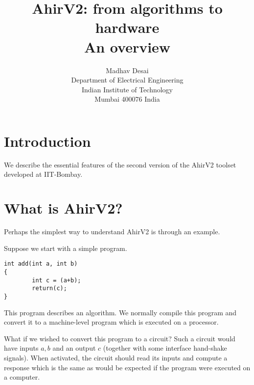 \documentclass{article}
\title{AhirV2: from algorithms to hardware \\ An overview }
\author{Madhav Desai \\ Department of Electrical Engineering \\ Indian Institute of Technology \\
	Mumbai 400076 India}
\begin{document}
\maketitle

\section{Introduction}

We describe the essential features
of the second version of the AhirV2 toolset
developed at IIT-Bombay.

\section{What is AhirV2?}

Perhaps the simplest way to understand AhirV2 is
through an example.

Suppose we start with a simple program.
\begin{verbatim}
int add(int a, int b)
{
        int c = (a+b);
        return(c);
}
\end{verbatim}
This program describes an algorithm.  We normally
compile this program and convert it to a machine-level
program which is executed on a processor.

What if we wished to convert this program to
a circuit?  
Such a circuit would have inputs 
$a,b$ and an output $c$ (together with some
interface hand-shake signals).  When activated,
the circuit should read its inputs and compute 
a response which is the same as would be expected
if the program were executed on a computer.
\end{document}
